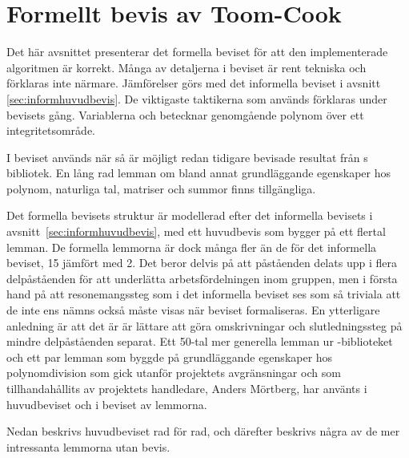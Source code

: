 \section{Formellt bevis av Toom-Cook}
\label{sec:formellbevis}
Det här avsnittet presenterar det formella beviset för att den implementerade
algoritmen är korrekt. Många av detaljerna i beviset är rent tekniska och
förklaras inte närmare. Jämförelser görs med det informella beviset i avsnitt
\ref{sec:informhuvudbevis}. De viktigaste taktikerna som används förklaras under
bevisets gång. Variablerna  och  betecknar genomgående polynom över
ett integritetsområde.

I beviset används när så är möjligt redan tidigare bevisade resultat från
\ssr{}s bibliotek. En lång rad lemman om bland annat grundläggande egenskaper
hos polynom, naturliga tal, matriser och summor finns tillgängliga.

Det formella bevisets struktur är modellerad efter det informella bevisets i
avsnitt~\ref{sec:informhuvudbevis}, med ett huvudbevis som bygger på ett
flertal lemman. De formella lemmorna är dock många fler än de för det
informella beviset, 15 jämfört med 2. Det beror delvis på att påståenden delats
upp i flera delpåståenden för att underlätta arbetsfördelningen inom gruppen,
men i första hand på att resonemangssteg som i det informella beviset ses som
så triviala att de inte ens nämns också måste visas när beviset formaliseras.
En ytterligare anledning är att det är är lättare att göra omskrivningar och
slutledningssteg på mindre delpåståenden separat. Ett 50-tal mer generella
lemman ur \ssr{}-biblioteket och ett par lemman som byggde på grundläggande
egenskaper hos polynomdivision som gick utanför projektets avgränsningar och
som tillhandahållits av projektets handledare, Anders Mörtberg, har använts i
huvudbeviset och i beviset av lemmorna.

Nedan beskrivs huvudbeviset rad för rad, och därefter beskrivs några av de mer
intressanta lemmorna utan bevis.

